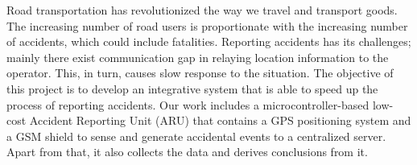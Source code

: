 Road transportation has revolutionized the way we travel and transport goods. The increasing number of road users is proportionate with the increasing number of accidents, which could include fatalities. Reporting accidents has its challenges; mainly there exist communication gap in relaying location information to the operator. This, in turn, causes slow response to the situation. The objective of this project is to develop an integrative system that is able to speed up the process of reporting accidents. Our work includes a microcontroller-based low-cost Accident Reporting Unit (ARU) that contains a GPS positioning system and a GSM shield to sense and generate accidental events to a centralized server. Apart from that, it also collects the data and derives conclusions from it.